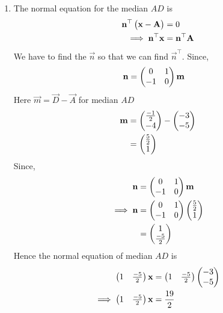 \documentclass[11pt]{book}
\begin{document}
\begin{enumerate}[label=\thesection.\arabic*.,ref=\thesection.\theenumi]
\begin{enumerate}
 \item The normal equation for the median $AD$ is
  \begin{align}
    \mathbf{n}^{\top}\begin{pmatrix}\mathbf{x}-\mathbf{A}\end{pmatrix}&=0\\
    \implies
    \mathbf{n}^{\top}\mathbf{x}&=\mathbf{n}^{\top}\mathbf{A}
  \end{align}
 We have to find the $\vec{n}$ so that we can find $\vec{n}^{\top}$.
 Since,
\begin{align}
  \mathbf{n} &= \begin{pmatrix}0 & 1\\
  -1 & 0\end{pmatrix}\mathbf{m}
\end{align}
Here $\vec{m} = \vec{D}- \vec{A}$ for median $AD$
\begin{align}
\mathbf{m}&=\begin{pmatrix}\frac{-1}{2}\\ -4\end{pmatrix} - \begin{pmatrix}-3\\-5\end{pmatrix}\\
       &=\begin{pmatrix}\frac{5}{2}\\1\end{pmatrix}
\end{align}
Since,
\begin{align}
  \mathbf{n} &= \begin{pmatrix}0 & 1\\
  -1 & 0\end{pmatrix}\mathbf{m}\\
\implies
\mathbf{n} &= \begin{pmatrix}0 & 1\\
  -1 & 0\end{pmatrix}\begin{pmatrix}\frac{5}{2}\\1\end{pmatrix}\\
        &= \begin{pmatrix}1 \\\frac{-5}{2}\end{pmatrix}
\end{align}
Hence the normal equation of median $AD$ is 
\begin{align}
    \begin{pmatrix}1 & \frac{-5}{2}\end{pmatrix}\mathbf{x}&=\begin{pmatrix}1 & \frac{-5}{2}\end{pmatrix}\begin{pmatrix}-3\\-5\end{pmatrix}\\
    \implies
    \begin{pmatrix}1 & \frac{-5}{2}\end{pmatrix}\mathbf{x}&=\frac{19}{2}
\end{align}


\end{enumerate}
\end{enumerate}
\end{document}
